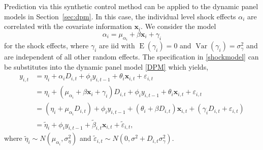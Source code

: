 \documentclass[11pt]{article}
\newcommand{\x}{\textbf{x}}
\DeclareMathOperator{\E}{E}
\DeclareMathOperator{\Var}{Var}
\begin{document}
Prediction via this synthetic control method can be applied to the dynamic 
panel models in Section~\ref{sec:dpm}.  In this case, the individual level 
shock effects $\alpha_i$ are correlated with the covariate information 
$\x_i$.  We consider the model 
\begin{equation} \label{shockmodel}
  \alpha_{i} = \mu_{\alpha_i} + \beta\x_i + \gamma_{i}
\end{equation}
for the shock effects, where $\gamma_{i}$ are iid with 
$\E(\gamma_i) = 0$ and $\Var(\gamma_i) = \sigma^2_\gamma$ and are 
independent of all other random effects.  
The specification in \eqref{shockmodel} can be substitutes into the dynamic 
panel model \eqref{DPM} which yields,
\begin{align*} 
  y_{i,t} &= \eta_i + \alpha_iD_{i,t} + \phi_i y_{i,t-1} + \theta_i \x_{i,t} 
    + \varepsilon_{i,t} \\
  &= \eta_i + (\mu_{\alpha_i} + \beta\x_i + \gamma_{i})D_{i,t} 
    + \phi_i y_{i,t-1} + \theta_i \x_{i,t} + \varepsilon_{i,t} \\
  &= (\eta_i + \mu_{\alpha_i}D_{i,t}) + \phi_i y_{i,t-1} 
    + (\theta_i + \beta D_{i,t})\x_{i,t} + (\gamma_{i}D_{i,t} 
    + \varepsilon_{i,t}) \\
  &= \tilde\eta_i + \phi_i y_{i,t-1} + \tilde\beta_{i,t}\x_{i,t} + \tilde\varepsilon_{i,t},
\end{align*}
where $\tilde\eta_i \sim N(\mu_{\alpha_i},\sigma^2_\eta)$ 
and $\tilde\varepsilon_{i,t} \sim N(0, \sigma^2 + D_{i,t}\sigma^2_\gamma)$.





\end{document}
